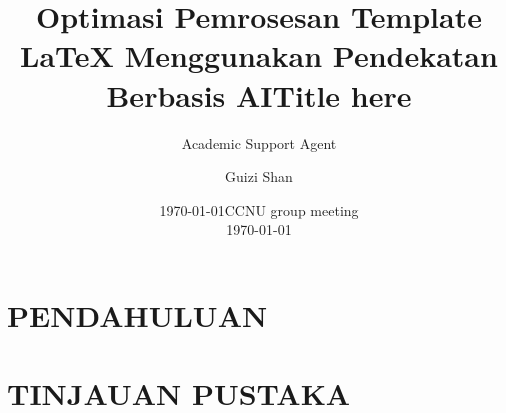 \documentclass{beamer}
\title{Optimasi Pemrosesan Template LaTeX Menggunakan Pendekatan Berbasis AI}
\author{Academic Support Agent}
\date{\today}
\begin{document}
\maketitle

\begin{abstract}

\end{abstract}

\chapter{PENDAHULUAN}


\chapter{TINJAUAN PUSTAKA}



\usepackage{slashed}
\usepackage{datetime}
\graphicspath{{plots/}}
\usepackage{hyperref}
\usepackage{cancel}
\usepackage[absolute,overlay]{textpos}
\def\Put(#1,#2)#3{\leavevmode\makebox(0,0){\put(#1,#2){#3}}}

\def\mydate{\leavevmode\hbox{\the\year-\twodigits\month-\twodigits\day}}
\def\twodigits#1{\ifnum#1<10 0\fi\the#1}

\newcommand\Wider[2][3em]{%
\makebox[\linewidth][c]{%
  \begin{minipage}{\dimexpr\textwidth+#1\relax}
  \raggedright
  \centering#2
  \end{minipage}%
  }%
}

\def\meetingname{CCNU group meeting}

\title[\meetingname]{Title here}
\author[G Shan]{Guizi Shan}
\date[\mydate]{\meetingname\\\today}
\end{document}
